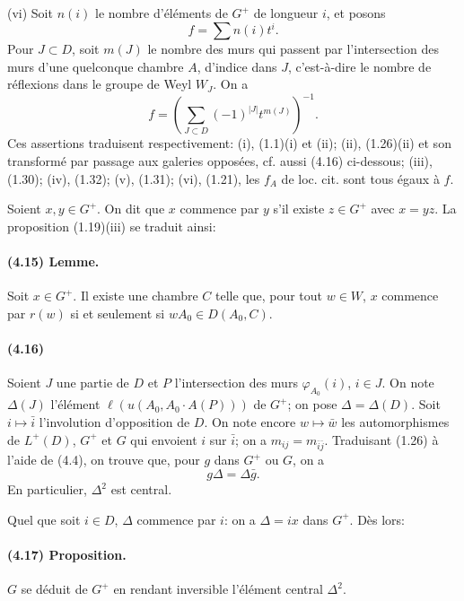 \documentclass[10pt]{article}
\begin{document}
(vi) Soit \(n(i)\) le nombre d'éléments de \(G^+\) de longueur \(i\), et posons
\[
f=\sum n(i)t^i.
\]
Pour \(J\subset D\), soit \(m(J)\) le nombre des murs qui passent par l'intersection des murs d'une quelconque chambre \(A\), d'indice dans \(J\), c'est-à-dire le nombre de réflexions dans le groupe de Weyl \(W_J\). On a
\[
f=\left(\sum_{J\subset D}(-1)^{|J|}t^{m(J)}\right)^{-1}.
\]
Ces assertions traduisent respectivement: (i), (1.1)(i) et (ii); (ii), (1.26)(ii) et son transformé par passage aux galeries opposées, cf. aussi (4.16) ci-dessous; (iii), (1.30); (iv), (1.32); (v), (1.31); (vi), (1.21), les \(f_A\) de loc. cit. sont tous égaux à \(f\).

Soient \(x,y\in G^+\). On dit que \(x\) commence par \(y\) s'il existe \(z\in G^+\) avec \(x=yz\). La proposition (1.19)(iii) se traduit ainsi:

\paragraph{(4.15) Lemme.} Soit \(x\in G^+\). Il existe une chambre \(C\) telle que, pour tout \(w\in W\), \(x\) commence par \(r(w)\) si et seulement si \(wA_0\in D(A_0,C)\).

\paragraph{(4.16)} Soient \(J\) une partie de \(D\) et \(P\) l'intersection des murs \(\varphi_{A_0}(i)\), \(i\in J\). On note \(\Delta(J)\) l'élément \(\ell(u(A_0,A_0\cdot A(P)))\) de \(G^+\); on pose \(\Delta=\Delta(D)\). Soit \(i\mapsto\bar i\) l'involution d'opposition de \(D\). On note encore \(w\mapsto\bar w\) les automorphismes de \(L^+(D)\), \(G^+\) et \(G\) qui envoient \(i\) sur \(\bar i\); on a \(m_{ij}=m_{\bar i\bar j}\). Traduisant (1.26) à l'aide de (4.4), on trouve que, pour \(g\) dans \(G^+\) ou \(G\), on a
\[
\tag{4.16.1}
g\Delta=\Delta\bar g.
\]
En particulier, \(\Delta^2\) est central.

Quel que soit \(i\in D\), \(\Delta\) commence par \(i\): on a \(\Delta=ix\) dans \(G^+\). Dès lors:

\paragraph{(4.17) Proposition.} \(G\) se déduit de \(G^+\) en rendant inversible l'élément central \(\Delta^2\).
\end{document}
